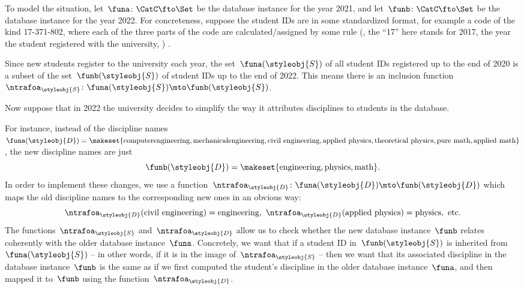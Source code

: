 To model the situation, let~$\funa \colon \CatC \fto \Set$ be the database instance for the year 2021, and let~$\funb \colon \CatC \fto \Set$ be the database instance for the year 2022.
For concreteness, suppose the student IDs are in some standardized format, for example a code of the kind 17-371-802, where each of the three parts of the code are calculated/assigned by some rule (, the ``17'' here stands for 2017, the year the student registered with the university, \etc)
.

Since new students register to the university each year, the set~$\funa(\styleobj{S})$ of all student IDs registered up to the end of 2020 is a subset of the set~$\funb(\styleobj{S})$ of student IDs up to the end of 2022.
This means there is an inclusion function~$\ntrafoa_{\styleobj{S}} \colon \funa(\styleobj{S}) \mto \funb(\styleobj{S})$.

Now suppose that in 2022 the university decides to simplify the way it attributes disciplines to students in the database.

For instance, instead of the discipline names~$\funa(\styleobj{D}) = \makeset{ \text{computer} \text{engineering}, 
\text{mechanical} \text{engineering}, \text{civil}\ \text{engineering}, \text{applied}\ \text{physics}, \text{theoretical}\ \text{physics}, \text{pure}\ \text{math}, \linebreak[1]\text{applied}\ \text{math} }$, the new discipline names are just
%
\begin{equation}
    \funb(\styleobj{D}) = \makeset{ \text{engineering}, \text{physics}, \text{math} }.
\end{equation}
%
In order to implement these changes, we use a function~$\ntrafoa_{\styleobj{D}}\colon \funa(\styleobj{D}) \mto \funb(\styleobj{D})$ which maps the old discipline names to the corresponding new ones in an obvious way:
\begin{equation}
    \ntrafoa_{\styleobj{D}}(\text{civil engineering}) = \text{engineering}, \ \ntrafoa_{\styleobj{D}}(\text{applied physics}) = \text{physics}, \ \text{etc.}
\end{equation}
The functions~$\ntrafoa_\styleobj{S}$ and~$\ntrafoa_\styleobj{D}$ allow us to check whether the new database instance~$\funb$ relates coherently with the older database instance~$\funa$.
Concretely, we want that if a student ID in~$\funb(\styleobj{S})$ is inherited from~$\funa(\styleobj{S})$ -- in other words, if it is in the image of~$\ntrafoa_{\styleobj{S}}$ -- then we want that its associated discipline in the database instance~$\funb$ is the same as if we first computed the student's discipline in the older database instance~$\funa$, and then mapped it to~$\funb$ using the function~$\ntrafoa_{\styleobj{D}}$.

